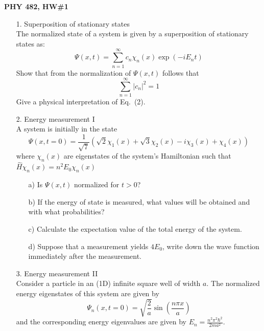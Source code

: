 \documentclass[11pt]{article}
\begin{document}
\thispagestyle{empty}


\centerline{\bf PHY 482,  HW\#1}

\begin{itemize}
%
\item[1.] Superposition of stationary states\\
The normalized state of a system is given by a superposition of stationary states as:
\begin{equation}
\Psi(x,t) = \sum\limits_{n=1}^{\infty} c_n \chi_n(x) \exp(-iE_nt)
\end{equation}
Show that from the normalization of $\Psi(x,t)$ follows that
\begin{equation}
\sum\limits_{n=1}^{\infty} |c_n|^2 = 1
\end{equation}
Give a physical interpretation of Eq.\ (2).
%
\vspace*{0.25cm}
%
\item[2.] Energy measurement I\\
A system is initially in the state
\begin{displaymath}
\Psi(x,t=0) =
\frac{1}{\sqrt{7}}\left(
\sqrt{2}\chi_1(x)
+\sqrt{3}\chi_2(x)
-i\chi_3(x)
+\chi_4(x)
\right)
\end{displaymath}
where $\chi_n(x)$ are eigenstates of the system's Hamiltonian such that ${\hat H}\chi_n(x)=n^2 E_0\chi_n(x)$
\begin{itemize}
\item[a)]
Is $\Psi(x,t)$ normalized for $t>0$?
\item[b)]
If the energy of state is measured, what values will be obtained and with what probabilities?
\item[c)]
Calculate the expectation value of the total energy of the system.
\item[d)]
Suppose that a measurement yields $4E_0$, write down the wave function immediately after the measurement.
\end{itemize}
%
\vspace*{0.25cm}
%
\item[3.] Energy measurement II\\
Consider a particle in an (1D) infinite square well of width $a$. The normalized energy eigenstates of this system are given by \begin{displaymath}
\Psi_n(x,t=0) = \sqrt{\frac{2}{a}} \sin\left(\frac{n\pi x}{a}\right)
\end{displaymath}
and the corresponding energy eigenvalues are given by $E_n =\frac{n^2\pi^2\hbar^2}{2ma^2}$.
\\ \\

\end{itemize}
\end{document}
